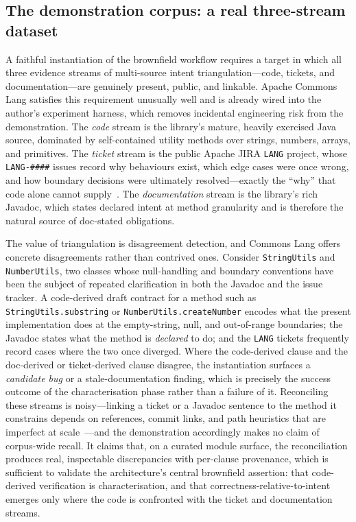 \subsection{The demonstration corpus: a real three-stream dataset}
\label{subsec:inst-corpus}

A faithful instantiation of the brownfield workflow requires a target in which all three evidence streams of multi-source intent triangulation---code, tickets, and documentation---are genuinely present, public, and linkable. Apache Commons Lang satisfies this requirement unusually well and is already wired into the author's experiment harness, which removes incidental engineering risk from the demonstration. The \emph{code} stream is the library's mature, heavily exercised Java source, dominated by self-contained utility methods over strings, numbers, arrays, and primitives. The \emph{ticket} stream is the public Apache JIRA \texttt{LANG} project, whose \texttt{LANG-\#\#\#\#} issues record why behaviours exist, which edge cases were once wrong, and how boundary decisions were ultimately resolved---exactly the ``why'' that code alone cannot supply~\cite{merten2015issuetracking,montgomery2022jira}. The \emph{documentation} stream is the library's rich Javadoc, which states declared intent at method granularity and is therefore the natural source of doc-stated obligations.

The value of triangulation is disagreement detection, and Commons Lang offers concrete disagreements rather than contrived ones. Consider \texttt{StringUtils} and \texttt{NumberUtils}, two classes whose null-handling and boundary conventions have been the subject of repeated clarification in both the Javadoc and the issue tracker. A code-derived draft contract for a method such as \texttt{StringUtils.substring} or \texttt{NumberUtils.createNumber} encodes what the present implementation does at the empty-string, null, and out-of-range boundaries; the Javadoc states what the method is \emph{declared} to do; and the \texttt{LANG} tickets frequently record cases where the two once diverged. Where the code-derived clause and the doc-derived or ticket-derived clause disagree, the instantiation surfaces a \emph{candidate bug} or a stale-documentation finding, which is precisely the success outcome of the characterisation phase rather than a failure of it. Reconciling these streams is noisy---linking a ticket or a Javadoc sentence to the method it constrains depends on references, commit links, and path heuristics that are imperfect at scale~\cite{antoniol2002recovering,borg2014recovering,tan2012tcomment}---and the demonstration accordingly makes no claim of corpus-wide recall. It claims that, on a curated module surface, the reconciliation produces real, inspectable discrepancies with per-clause provenance, which is sufficient to validate the architecture's central brownfield assertion: that code-derived verification is characterisation, and that correctness-relative-to-intent emerges only where the code is confronted with the ticket and documentation streams.

